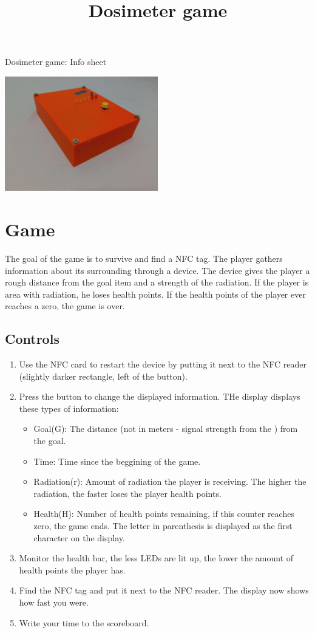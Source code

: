 \documentclass{article}
\title{Dosimeter game}
\begin{document}
{\huge{Dosimeter game: Info sheet}}

\begin{center}
    \centering
    \includegraphics[width=0.5\textwidth]{imgs/Box2.jpg}
\end{center}

\section{Game}
The goal of the game is to survive and find a NFC tag. 
The player gathers information about its surrounding through a device.
The device gives the player a rough distance from the goal item and a strength of the radiation.
If the player is area with radiation, he loses health points.
If the health points of the player ever reaches a zero, the game is over.

\subsection{Controls}
\begin{enumerate}
\item Use the NFC card to restart the device by putting it next to the NFC reader (slightly darker rectangle, left of the button).
\item Press the button to change the displayed information. THe display displays these types of information:
\begin{itemize}
\item Goal(G): The distance (not in meters - signal strength from the ) from the goal.
\item Time: Time since the beggining of the game.
\item Radiation(r): Amount of radiation the player is receiving. The higher the radiation, the faster loses the player health points. 
\item Health(H): Number of health points remaining, if this counter reaches zero, the game ends.
The letter in parenthesis is displayed as the first character on the display.
\end{itemize}
\item Monitor the health bar, the less LEDs are lit up, the lower the amount of health points the player has.
\item Find the NFC tag and put it next to the NFC reader. The display now shows how fast you were.
\item Write your time to the scoreboard.
\end{enumerate}
\end{document}
